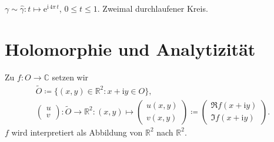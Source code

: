 \documentclass[a4paper,10pt]{scrbook}
\begin{document}
\begin{example}
\begin{enum-arab}
\begin{enum-alph}
      $\gamma \sim \hat{\gamma} : t \mapsto \mathrm{e}^{\mathrm{i} \, 4\pi \, t}$, $0 \leq t \leq 1$. Zweimal durchlaufener Kreis.
    \end{enum-alph}
  \end{enum-arab}
\end{example}

%
%

\section{Holomorphie und Analytizität}
\addtocounter{thmn}{1}
\setcounter{theorem}{0}


\begin{theorem}[Vereinbarung]
  Zu $f : O \to \mathbb{C}$ setzen wir
  \begin{gather*}
    \widetilde{O} \coloneq \{ (x,y) \in \mathbb{R}^2 : x + \mathrm{i} y \in O \} , \\
    \begin{pmatrix} u \\ v \end{pmatrix} : \widetilde{O} \to \mathbb{R}^2 : (x,y) \mapsto \begin{pmatrix} u(x,y) \\ v(x,y) \end{pmatrix} \coloneq \begin{pmatrix} \Re f(x + \mathrm{i} y) \\ \Im f(x + \mathrm{i} y) \end{pmatrix}.
  \end{gather*}
  $f$ wird interpretiert als Abbildung von $\mathbb{R}^2$ nach $\mathbb{R}^2$.
\end{theorem}
\end{document}
